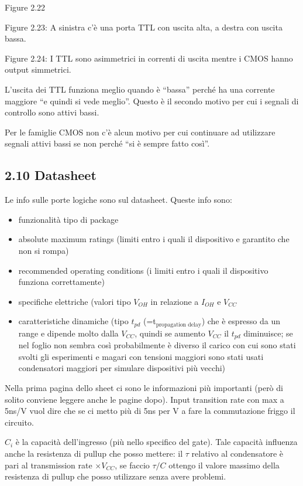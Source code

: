 \documentclass[
]{article}
\providecommand{\tightlist}{%
  \setlength{\itemsep}{0pt}\setlength{\parskip}{0pt}}
\begin{document}
Figure 2.22

Figure 2.23: A sinistra c'è una porta TTL con uscita alta, a destra con
uscita bassa.

Figure 2.24: I TTL sono asimmetrici in correnti di uscita mentre i CMOS
hanno output simmetrici.

L'uscita dei TTL funziona meglio quando è ``bassa'' perché ha una
corrente maggiore ``e quindi si vede meglio''. Questo è il secondo
motivo per cui i segnali di controllo sono attivi bassi.

Per le famiglie CMOS non c'è alcun motivo per cui continuare ad
utilizzare segnali attivi bassi se non perché ``si è sempre fatto
così''.

\subsection{2.10 Datasheet}\label{datasheet}

Le info sulle porte logiche sono sul datasheet. Queste info sono:

\begin{itemize}
\tightlist
\item
  funzionalità tipo di package
\item
  absolute maximum ratings (limiti entro i quali il dispositivo e
  garantito che non si rompa)
\item
  recommended operating conditions (i limiti entro i quali il
  dispositivo funziona correttamente)
\item
  specifiche elettriche (valori tipo \(V_{OH}\) in relazione a
  \(I_{OH}\) e \(V_{CC}\)
\item
  caratteristiche dinamiche (tipo \(t_{pd}\)
  (=t\({}_{\text{propagation delay}}\)) che è espresso da un range e
  dipende molto dalla \(V_{CC}\), quindi se aumento \(V_{CC}\) il
  \(t_{pd}\) diminuisce; se nel foglio non sembra così probabilmente è
  diverso il carico con cui sono stati svolti gli esperimenti e magari
  con tensioni maggiori sono stati usati condensatori maggiori per
  simulare dispositivi più vecchi)
\end{itemize}

Nella prima pagina dello sheet ci sono le informazioni più importanti
(però di solito conviene leggere anche le pagine dopo). Input transition
rate con max a 5ns/V vuol dire che se ci metto più di 5ns per V a fare
la commutazione friggo il circuito.

\(C_{i}\) è la capacità dell'ingresso (più nello specifico del gate).
Tale capacità influenza anche la resistenza di pullup che posso mettere:
il \(\tau\) relativo al condensatore è pari al transmission rate
\(\times V_{CC}\), se faccio \(\tau/C\) ottengo il valore massimo della
resistenza di pullup che posso utilizzare senza avere problemi.
\end{document}

